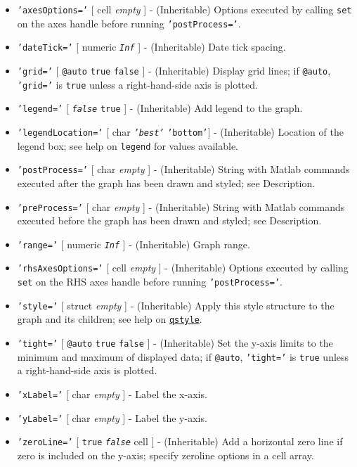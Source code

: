 \begin{itemize}
\item
  \texttt{'axesOptions='} {[} cell \textbar{} \emph{empty} {]} -
  (Inheritable) Options executed by calling \texttt{set} on the axes
  handle before running \texttt{'postProcess='}.
\item
  \texttt{'dateTick='} {[} numeric \textbar{} \emph{\texttt{Inf}} {]} -
  (Inheritable) Date tick spacing.
\item
  \texttt{'grid='} {[} \texttt{@auto} \textbar{} \texttt{true}
  \textbar{} \texttt{false} {]} - (Inheritable) Display grid lines; if
  \texttt{@auto}, \texttt{'grid='} is \texttt{true} unless a
  right-hand-side axis is plotted.
\item
  \texttt{'legend='} {[} \emph{\texttt{false}} \textbar{} \texttt{true}
  {]} - (Inheritable) Add legend to the graph.
\item
  \texttt{'legendLocation='} {[} char \textbar{} \emph{\texttt{'best'}}
  \textbar{} \texttt{'bottom'}{]} - (Inheritable) Location of the legend
  box; see help on \texttt{legend} for values available.
\item
  \texttt{'postProcess='} {[} char \textbar{} \emph{empty} {]} -
  (Inheritable) String with Matlab commands executed after the graph has
  been drawn and styled; see Description.
\item
  \texttt{'preProcess='} {[} char \textbar{} \emph{empty} {]} -
  (Inheritable) String with Matlab commands executed before the graph
  has been drawn and styled; see Description.
\item
  \texttt{'range='} {[} numeric \textbar{} \emph{\texttt{Inf}} {]} -
  (Inheritable) Graph range.
\item
  \texttt{'rhsAxesOptions='} {[} cell \textbar{} \emph{empty} {]} -
  (Inheritable) Options executed by calling \texttt{set} on the RHS axes
  handle before running \texttt{'postProcess='}.
\item
  \texttt{'style='} {[} struct \textbar{} \emph{empty} {]} -
  (Inheritable) Apply this style structure to the graph and its
  children; see help on \href{qreport/qstyle}{\texttt{qstyle}}.
\item
  \texttt{'tight='} {[} \texttt{@auto} \textbar{} \texttt{true}
  \textbar{} \texttt{false} {]} - (Inheritable) Set the y-axis limits to
  the minimum and maximum of displayed data; if \texttt{@auto},
  \texttt{'tight='} is \texttt{true} unless a right-hand-side axis is
  plotted.
\item
  \texttt{'xLabel='} {[} char \textbar{} \emph{empty} {]} - Label the
  x-axis.
\item
  \texttt{'yLabel='} {[} char \textbar{} \emph{empty} {]} - Label the
  y-axis.
\item
  \texttt{'zeroLine='} {[} \texttt{true} \textbar{}
  \emph{\texttt{false}} \textbar{} cell {]} - (Inheritable) Add a
  horizontal zero line if zero is included on the y-axis; specify
  zeroline options in a cell array.
\end{itemize}

